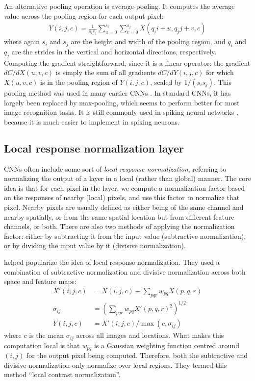 An alternative pooling operation is average-pooling.
It computes the average value across the pooling region for each output pixel:
\begin{align}
  Y(i,j,c) = \frac{1}{s_i s_j} \sum_{u=0}^{s_i} \sum_{v=0}^{s_j} X(q_i i + u, q_j j + v,c)
\end{align}
where again $s_i$ and $s_j$ are the height and width of the pooling region,
and $q_i$ and $q_j$ are the strides in the vertical and horizontal directions,
respectively.
Computing the gradient straightforward, since it is a linear operator:
the gradient $dC / dX(u,v,c)$ is simply the sum of all gradients $dC / dY(i,j,c)$
for which $X(u,v,c)$ is in the pooling region of $Y(i,j,c)$,
scaled by $1 / (s_i s_j)$.
This pooling method was used in many earlier CNNs \parencite[\eg/][]{Lecun1998}.
In standard CNNs, it has largely been replaced by max-pooling,
which seems to perform better for most image recognition tasks.
It is still commonly used in spiking neural networks \parencite[\eg/][]{Diehl2015},
because it is much easier to implement in spiking neurons.


\subsection{Local response normalization layer}

CNNs often include some sort of \emph{local response normalization},
referring to normalizing the output of a layer in a local (rather than global) manner.
The core idea is that for each pixel in the layer,
we compute a normalization factor based on the responses of nearby (local) pixels,
and use this factor to normalize that pixel.
Nearby pixels are usually defined as either being of the same channel
and nearby spatially,
or from the same spatial location but from different feature channels,
or both.
There are also two methods of applying the normalization factor:
either by subtracting it from the input value (subtractive normalization),
or by dividing the input value by it (divisive normalization).

\textcite{Jarrett2009} helped popularize the idea of local response normalization.
They used a combination of subtractive normalization and divisive normalization
across both space and feature maps:
\begin{align}
  X'(i,j,c) &= X(i,j,c) - \sum_{pqr} w_{pq} X(p,q,r) \\
  \sigma_{ij} &= \left(\sum_{pqr} w_{pq} X'(p,q,r)^2\right)^{1/2} \\
  Y(i,j,c) &= X'(i,j,c) / \max\left(c, \sigma_{ij}\right)
\end{align}
where $c$ is the mean $\sigma_{ij}$ across all images and locations.
What makes this computation local is that
$w_{pq}$ is a Gaussian weighting function
centred around $(i,j)$ for the output pixel being computed.
Therefore, both the subtractive and divisive normalization
only normalize over local regions.
They termed this method ``local contrast normalization''.


